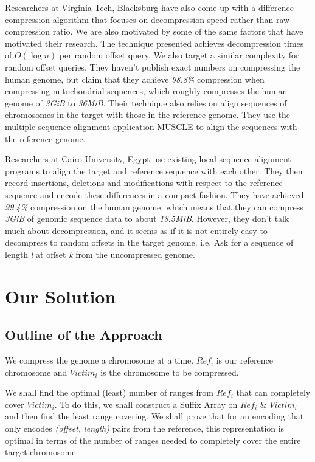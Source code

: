\documentclass[11pt]{article}
\begin{document}
Researchers at Virginia Tech, Blacksburg\cite{vtechresearch} have
also come up with a difference compression algorithm that focuses on
decompression speed rather than raw compression ratio. We are also
motivated by some of the same factors that have motivated their
research. The technique presented achieves decompression times of
$O(\log{n})$ per random offset query. We also target a similar
complexity for random offset queries. They haven't publish exact
numbers on compressing the human genome, but claim that they achieve
\textit{98.8\%} compression when compressing mitochondrial sequences,
which roughly compresses the human genome of \textit{3GiB} to
\textit{36MiB}. Their technique also relies on align sequences of
chromosomes in the target with those in the reference genome. They use
the multiple sequence alignment application MUSCLE\cite{muscle} to
align the sequences with the reference genome.

Researchers at Cairo University, Egypt\cite{cairo} use existing
local-sequence-alignment programs to align the target and reference
sequence with each other. They then record insertions, deletions and
modifications with respect to the reference sequence and encode these
differences in a compact fashion. They have achieved \textit{99.4\%}
compression on the human genome, which means that they can compress
\textit{3GiB} of genomic sequence data to about
\textit{18.5MiB}. However, they don't talk much about decompression,
and it seems as if it is not entirely easy to decompress to random
offsets in the target genome. i.e. Ask for a sequence of length
\textit{l} at offset \textit{k} from the uncompressed genome.

\section{Our Solution}

\subsection{Outline of the Approach}

We compress the genome a chromosome at a time. $Ref_i$ is our
reference chromosome and $Victim_i$ is the chromosome to be
compressed.

We shall find the optimal (least) number of ranges from $Ref_i$ that
can completely cover $Victim_i$. To do this, we shall construct a
Suffix Array on $Ref_i$ \& $Victim_i$ and then find the least range
covering. We shall prove that for an encoding that only encodes
\textit{(offset, length)} pairs from the reference, this
representation is optimal in terms of the number of ranges needed to
completely cover the entire target chromosome.
\end{document}
